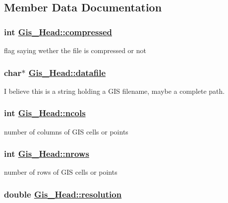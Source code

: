 \subsection{Member Data Documentation}
\hypertarget{structGis__Head_o17}{
\subsubsection[compressed]{\setlength{\rightskip}{0pt plus 5cm}int \hyperlink{structGis__Head_o17}{Gis\_\-Head::compressed}}}
\label{structGis__Head_o17}


flag saying wether the file is compressed or not 

\hypertarget{structGis__Head_o16}{
\subsubsection[datafile]{\setlength{\rightskip}{0pt plus 5cm}char$\ast$ \hyperlink{structGis__Head_o16}{Gis\_\-Head::datafile}}}
\label{structGis__Head_o16}


I believe this is a string holding a GIS filename, maybe a complete path. 

\hypertarget{structGis__Head_o8}{
\subsubsection[ncols]{\setlength{\rightskip}{0pt plus 5cm}int \hyperlink{structGis__Head_o8}{Gis\_\-Head::ncols}}}
\label{structGis__Head_o8}


number of columns of GIS cells or points 

\hypertarget{structGis__Head_o7}{
\subsubsection[nrows]{\setlength{\rightskip}{0pt plus 5cm}int \hyperlink{structGis__Head_o7}{Gis\_\-Head::nrows}}}
\label{structGis__Head_o7}


number of rows of GIS cells or points 

\hypertarget{structGis__Head_o6}{
\subsubsection[resolution]{\setlength{\rightskip}{0pt plus 5cm}double \hyperlink{structGis__Head_o6}{Gis\_\-Head::resolution}}}
\label{structGis__Head_o6}


